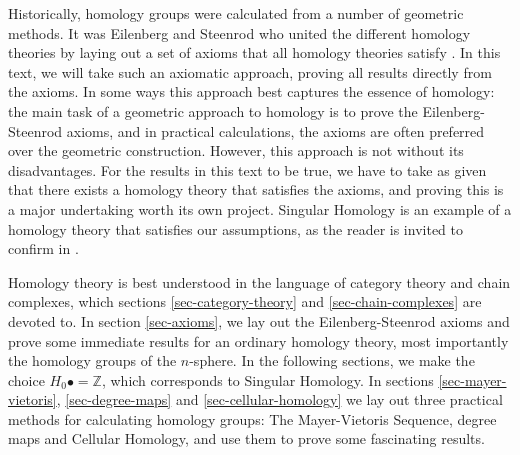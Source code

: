 Historically, homology groups were calculated from a number of geometric methods. It was Eilenberg and Steenrod who united the different homology theories by laying out a set of axioms that all homology theories satisfy \cite{Eilenberg}. In this text, we will take such an axiomatic approach, proving all results directly from the axioms. In some ways this approach best captures the essence of homology: the main task of a geometric approach to homology is to prove the Eilenberg-Steenrod axioms, and in practical calculations, the axioms are often preferred over the geometric construction. However, this approach is not without its disadvantages. For the results in this text to be true, we have to take as given that there exists a homology theory that satisfies the axioms, and proving this is a major undertaking worth its own project. Singular Homology is an example of a homology theory that satisfies our assumptions, as the reader is invited to confirm in \cite{Hatcher}.

Homology theory is best understood in the language of category theory and chain complexes, which sections \ref{sec-category-theory} and \ref{sec-chain-complexes} are devoted to. In section \ref{sec-axioms}, we lay out the Eilenberg-Steenrod axioms and prove some immediate results for an ordinary homology theory, most importantly the homology groups of the $n$-sphere. In the following sections, we make the choice $H_0 \bullet=\mathbb{Z}$, which corresponds to Singular Homology. In sections \ref{sec-mayer-vietoris}, \ref{sec-degree-maps} and \ref{sec-cellular-homology} we lay out three practical methods for calculating homology groups: The Mayer-Vietoris Sequence, degree maps and Cellular Homology, and use them to prove some fascinating results.